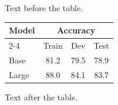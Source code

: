 \documentclass{article}
\begin{document}
Text before the table.

\begin{tabular}{lccc}\toprule Model & \multicolumn{3}{c}{Accuracy}\\\cmidrule(lr){2-4} & Train & Dev & Test\\\midrule Base & 81.2 & 79.5 & 78.9\\Large & 88.0 & 84.1 & 83.7\\\bottomrule\end{tabular}

Text after the table.
\end{document}
